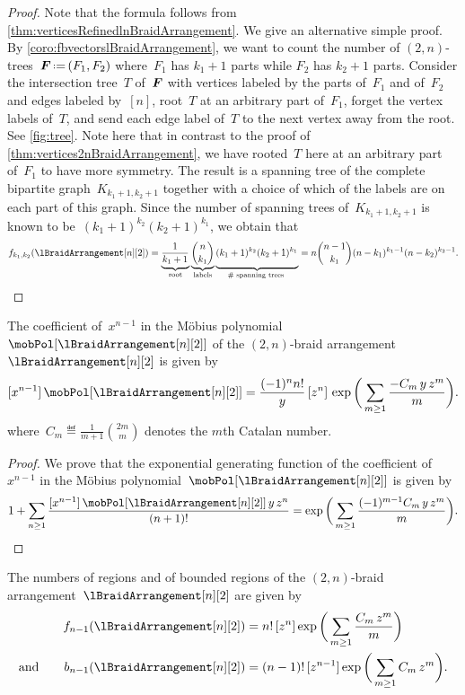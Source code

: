 \begin{proof}
Note that the formula follows from \cref{thm:verticesRefinedlnBraidArrangement}.
We give an alternative simple proof.
By \cref{coro:fbvectorslBraidArrangement}, we want to count the number of $(2,n)$-trees~$\b{F} \eqdef (F_1,F_2)$ where~$F_1$ has $k_1+1$ parts while $F_2$ has $k_2+1$ parts.
Consider the intersection tree~$T$ of~$\boldsymbol{F}$ with vertices labeled by the parts of~$F_1$ and of~$F_2$ and edges labeled by~$[n]$, root~$T$ at an arbitrary part of~$F_1$, forget the vertex labels of~$T$, and send each edge label of~$T$ to the next vertex away from the root.
See \cref{fig:tree}.
Note here that in contrast to the proof of \cref{thm:vertices2nBraidArrangement}, we have rooted~$T$ here at an arbitrary part of~$F_1$ to have more symmetry.
The result is a spanning tree of the complete bipartite graph~$K_{k_1+1, k_2+1}$ together with a choice of which of the labels are on each part of this graph.
Since the number of spanning trees of~$K_{k_1+1, k_2+1}$ is known to be~$(k_1+1)^{k_2} (k_2+1)^{k_1}$, we obtain that
\[
f_{k_1, k_2}(\lBraidArrangement[n][2]) = \underbrace{\frac{1}{k_1+1}  \phantom{\!\!\!\!\bigg)}}_{\text{root}} \underbrace{\binom{n}{k_1}}_{\text{labels}} \underbrace{(k_1+1)^{k_2} (k_2+1)^{k_1} \phantom{\!\!\!\!\bigg)}}_{\# \text{ spanning trees }} = n \binom{n-1}{k_1} (n-k_1)^{k_1-1} (n-k_2)^{k_2-1}.
\qedhere
\]
\end{proof}

\begin{theorem}
\label{thm:facets2BraidArrangement}
The coefficient of~$x^{n-1}$ in the M\"obius polynomial~$\mobPol[{\lBraidArrangement[n][2]}]$ of the $(2,n)$-braid arrangement~$\lBraidArrangement[n][2]$ is given by
\[
[x^{n-1}] \, \mobPol[{\lBraidArrangement[n][2]}] = \frac{(-1)^n n!}{y} \, [z^n] \, \exp \bigg( \sum_{m \ge 1} \frac{- C_m \, y \, z^m}{m} \bigg).
\]
where~$\displaystyle C_m \eqdef \frac{1}{m+1} \binom{2m}{m}$ denotes the $m$th Catalan number.
\end{theorem}

\begin{proof}
We prove that the exponential generating function of the coefficient of~$x^{n-1}$ in the M\"obius polynomial~$\mobPol[{\lBraidArrangement[n][2]}]$ is given by
\[
1 + \sum_{n \ge 1} \frac{[x^{n-1}] \, \mobPol[{\lBraidArrangement[n][2]}] \, y \, z^n}{(n+1)!} = \exp \bigg( \sum_{m \ge 1} \frac{(-1)^{m-1} C_m \, y \, z^m}{m} \bigg).
\]
\end{proof}

\begin{corollary}
The numbers of regions and of bounded regions of the $(2,n)$-braid arrangement~$\lBraidArrangement[n][2]$ are given by
\begin{align*}
f_{n-1}(\lBraidArrangement[n][2]) 
& = n! \, [z^n] \exp \bigg( \sum_{m \ge 1} \frac{C_m \, z^m}{m} \bigg) \\
\text{and}\qquad
b_{n-1}(\lBraidArrangement[n][2]) 
& = (n-1)! \, [z^{n-1}] \exp \bigg( \sum_{m \ge 1} C_m \, z^m \bigg).
\end{align*}
\end{corollary}

